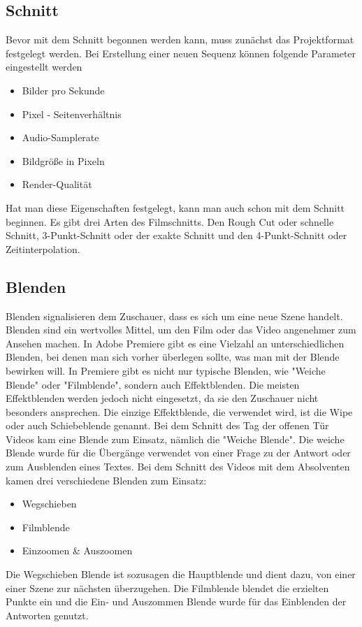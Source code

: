 \subsection{Schnitt}
Bevor mit dem Schnitt begonnen werden kann, muss zunächst das Projektformat festgelegt werden. Bei Erstellung einer neuen Sequenz können folgende Parameter eingestellt werden
\begin{itemize}
	\item Bilder pro Sekunde
	\item Pixel - Seitenverhältnis
	\item Audio-Samplerate
	\item Bildgröße in Pixeln
	\item Render-Qualität
\end{itemize}
Hat man diese Eigenschaften festgelegt, kann man auch schon mit dem Schnitt beginnen. Es gibt drei Arten des Filmschnitts. Den Rough Cut oder schnelle Schnitt, 3-Punkt-Schnitt oder der exakte Schnitt und den 4-Punkt-Schnitt oder Zeitinterpolation.\citep{schnitt}
\subsection{Blenden}
Blenden signalisieren dem Zuschauer, dass es sich um eine neue Szene handelt. Blenden sind ein wertvolles Mittel, um den Film oder das Video angenehmer zum Ansehen machen. In Adobe Premiere gibt es eine Vielzahl an unterschiedlichen Blenden, bei denen man sich vorher überlegen sollte, was man mit der Blende bewirken will. In Premiere gibt es nicht nur typische Blenden, wie "Weiche Blende" oder "Filmblende", sondern auch Effektblenden. Die meisten Effektblenden werden jedoch nicht eingesetzt, da sie den Zuschauer nicht besonders ansprechen. Die einzige Effektblende, die verwendet wird, ist die Wipe oder auch Schiebeblende genannt.\citep{blende}
Bei dem Schnitt des Tag der offenen Tür Videos kam eine Blende zum Einsatz, nämlich die "Weiche Blende". Die weiche Blende wurde für die Übergänge verwendet von einer Frage zu der Antwort oder zum Ausblenden eines Textes.\newline
Bei dem Schnitt des Videos mit dem Absolventen kamen drei verschiedene Blenden zum Einsatz:
\begin{itemize}
	\item Wegschieben
	\item Filmblende
	\item Einzoomen \& Auszoomen
\end{itemize}
Die Wegschieben Blende ist sozusagen die Hauptblende und dient dazu, von einer einer Szene zur nächsten überzugehen. Die Filmblende blendet die erzielten Punkte ein und die Ein- und Auszommen Blende wurde für das Einblenden der Antworten genutzt.
